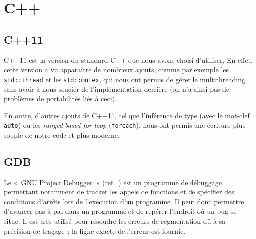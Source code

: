 \section{C++}

\subsection{C++11}
C++11 est la version du standard C++ que nous avons choisi d'utiliser. En effet, cette version a vu apparaître de nombreux ajouts, comme par exemple les \verb|std::thread| et les \verb|std::mutex|, qui nous ont permis de gérer le multithreading sans avoir à nous soucier de l'implémentation derrière (on n'a ainsi pas de problèmes de portabilités liés à ceci).

En outre, d'autres ajouts de C++11, tel que l'inférence de type (avec le mot-clef \verb|auto|) ou les \emph{ranged-based for loop} (\verb|foreach|), nous ont permis une écriture plus souple de notre code et plus moderne.

\subsection{GDB}
Le «~GNU Project Debugger~» (ref.~\cite{gdb}) est un programme de débuggage permettant notamment de tracker les appels de fonctions et de spécifier des conditions d'arrêts lors de l'exécution d'un programme. Il peut donc permettre d'avancer pas à pas dans un programme et de repérer l'endroit où un bug se situe. Il est très utilisé pour résoudre les erreurs de segmentation dû à sa précision de traçage~: la ligne exacte de l'erreur est fournie.
